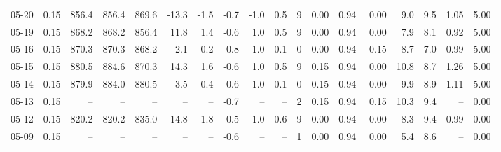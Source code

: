 \begin{threeparttable}
{\begin{tabular}{lrrrrrrrrrrrrrrrrr}
  05-20 &     0.15 & 856.4 & 856.4 & 869.6 &      -13.3 &           -1.5 &                      -0.7 &                     -1.0 &                 0.5 &              9 &       0.00 &      0.94 &           0.00 &              9.0 &                 9.5 &            1.05 &                   5.00 \\
  05-19 &     0.15 & 868.2 & 868.2 & 856.4 &       11.8 &            1.4 &                      -0.6 &                      1.0 &                 0.5 &              9 &       0.00 &      0.94 &           0.00 &              7.9 &                 8.1 &            0.92 &                   5.00 \\
  05-16 &     0.15 & 870.3 & 870.3 & 868.2 &        2.1 &            0.2 &                      -0.8 &                      1.0 &                 0.1 &              0 &       0.00 &      0.94 &          -0.15 &              8.7 &                 7.0 &            0.99 &                   5.00 \\
  05-15 &     0.15 & 880.5 & 884.6 & 870.3 &       14.3 &            1.6 &                      -0.6 &                      1.0 &                 0.5 &              9 &       0.15 &      0.94 &           0.00 &             10.8 &                 8.7 &            1.26 &                   5.00 \\
  05-14 &     0.15 & 879.9 & 884.0 & 880.5 &        3.5 &            0.4 &                      -0.6 &                      1.0 &                 0.1 &              0 &       0.15 &      0.94 &           0.00 &              9.9 &                 8.9 &            1.11 &                   5.00 \\
  05-13 &     0.15 &    -- &    -- &    -- &         -- &             -- &                      -0.7 &                       -- &                  -- &              2 &       0.15 &      0.94 &           0.15 &             10.3 &                 9.4 &              -- &                   0.00 \\
  05-12 &     0.15 & 820.2 & 820.2 & 835.0 &      -14.8 &           -1.8 &                      -0.5 &                     -1.0 &                 0.6 &              9 &       0.00 &      0.94 &           0.00 &              8.3 &                 9.4 &            0.99 &                   0.00 \\
  05-09 &     0.15 &    -- &    -- &    -- &         -- &             -- &                      -0.6 &                       -- &                  -- &              1 &       0.00 &      0.94 &           0.00 &              5.4 &                 8.6 &              -- &                   0.00 \\

\end{tabular}}
\end{threeparttable}
